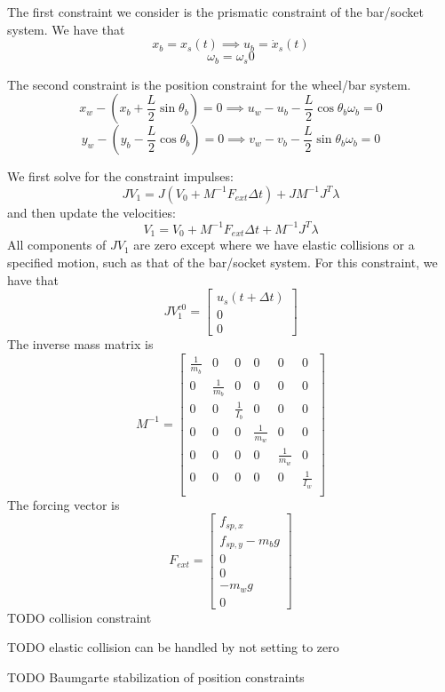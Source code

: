\documentclass[9pt]{article}
\begin{document}
The first constraint we consider is the prismatic constraint of the bar/socket system. We have that 
\[
x_b = x_s(t) \implies u_b = \dot{x}_s(t)
\]
\[
\omega_b = \omega_s 0
\]

The second constraint is the position constraint for the wheel/bar system. 
\[
x_w - \left(x_b + \frac{L}{2}\sin \theta_b\right) = 0 \implies u_w - u_b - \frac{L}{2}\cos \theta_b \omega_b = 0
\]
\[
y_w - \left(y_b - \frac{L}{2}\cos \theta_b\right) = 0 \implies v_w - v_b - \frac{L}{2}\sin \theta_b \omega_b = 0
\]

We first solve for the constraint impulses:
\[
J V_1 = J (V_0 + M^{-1} F_{ext} \Delta t) + J M^{-1} J^T \lambda
\]
and then update the velocities:
\[
V_1 = V_0 + M^{-1} F_{ext} \Delta t + M^{-1} J^T \lambda
\]
All components of $JV_1$ are zero except where we have elastic collisions or a specified motion, such as that of the bar/socket system. For this constraint, we have that 
\[
JV_1^{c0} = 
\left[
\begin{array}{c}
u_s(t + \Delta t) \\
0 \\
0
\end{array} 
\right]
\]
The inverse mass matrix is 
\[
M^{-1} = 
\left[
\begin{array}{cccccc}
\frac{1}{m_b} & 0 & 0 & 0 & 0 & 0 \\
0 & \frac{1}{m_b} & 0 & 0 & 0 & 0 \\
0 & 0 & \frac{1}{I_b} & 0 & 0 & 0 \\
0 & 0 & 0 & \frac{1}{m_w} & 0 & 0 \\
0 & 0 & 0 & 0 & \frac{1}{m_w} & 0 \\
0 & 0 & 0 & 0 & 0 & \frac{1}{I_w} \\
\end{array} 
\right]
\]
The forcing vector is 
\[
F_{ext} = 
\left[
\begin{array}{c}
f_{sp,x} \\
f_{sp,y} - m_b g \\
0 \\
0 \\
-m_w g \\
0
\end{array} 
\right]
\]
TODO collision constraint

TODO elastic collision can be handled by not setting to zero

TODO Baumgarte stabilization of position constraints
\end{document}
